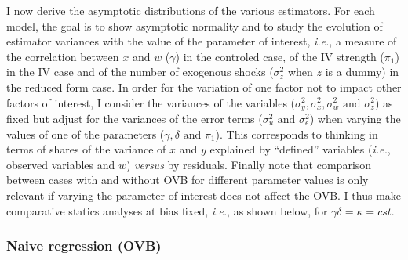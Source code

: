 \documentclass[usletter, 12pt]{article}
\begin{document}
			I now derive the asymptotic distributions of the various estimators. For each model, the goal is to show asymptotic normality and to study the evolution of estimator variances with the value of the parameter of interest, \textit{i.e.}, a measure of the correlation between $x$ and $w$ ($\gamma$) in the controled case, of the IV strength ($\pi_{1}$) in the IV case and of the number of exogenous shocks ($\sigma_{z}^{2}$ when $z$ is a dummy) in the reduced form case.  %
			In order for the variation of one factor not to impact other factors of interest, I consider the variances of the variables ($\sigma_{y}^{2}, \sigma_{x}^{2}, \sigma_{w}^{2} \text{ and } \sigma_{z}^{2}$) as fixed but adjust for the variances of the error terms ($\sigma_{u}^{2} \text{ and } \sigma_{\epsilon}^{2}$) when varying the values of one of the parameters ($\gamma, \delta \text{ and } \pi_{1}$). This corresponds to thinking in terms of shares of the variance of $x$ and $y$ explained by ``defined'' variables (\textit{i.e.}, observed variables and $w$) \textit{versus} by residuals. Finally note that comparison between cases with and without OVB for different parameter values is only relevant if varying the parameter of interest does not affect the OVB. I thus make comparative statics analyses at bias fixed, \textit{i.e.}, as shown below, for $\gamma \delta = \kappa = cst$.
			

			\subsubsection{Naive regression (OVB)}\label{formal_proof_ovb}
			
\end{document}
